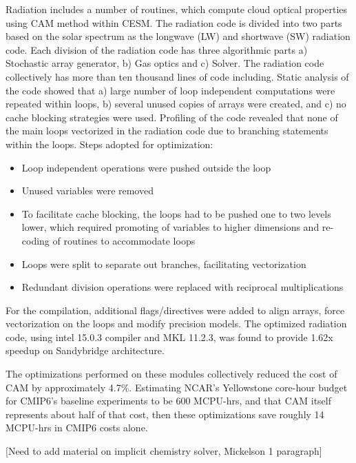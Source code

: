 Radiation includes a number of routines, which compute cloud optical properties using CAM method within CESM. The radiation code is divided into two parts based on the solar spectrum as the longwave (LW) and shortwave (SW) radiation code. Each division of the radiation code has three algorithmic parts a) Stochastic array generator, b) Gas optics and c) Solver. The radiation code collectively has more than ten thousand lines of code including. Static analysis of the code showed that a) large number of loop independent computations were repeated within loops, b) several unused copies of arrays were created, and c) no cache blocking strategies were used. 
Profiling of the code revealed that none of the main loops vectorized in the radiation code due to branching statements within the loops. Steps adopted for optimization:
\begin {itemize}
\item {Loop independent operations were pushed outside the loop}
\item {Unused variables were removed}
\item {To facilitate cache blocking, the loops had to be pushed one to two levels lower, which required promoting of variables to higher dimensions and re-coding of routines to accommodate loops}
\item {Loops were split to separate out branches, facilitating vectorization}
\item {Redundant division operations were replaced with reciprocal multiplications}
\end{itemize}

For the compilation, additional flags/directives were added to align arrays, force vectorization on the loops and modify precision models. 
The optimized radiation code, using intel 15.0.3 compiler and MKL 11.2.3, was found to provide 1.62x speedup on Sandybridge architecture. 

The optimizations performed on these modules collectively reduced the cost of CAM by approximately 4.7\%. Estimating NCAR’s Yellowstone core-hour budget for CMIP6’s baseline experiments to be 600 MCPU-hrs, and that CAM itself represents about half of that cost, then these optimizations save roughly 14 MCPU-hrs in CMIP6 costs alone. 

{\color{red} [Need to add material on implicit chemistry solver, Mickelson 1 paragraph]}
